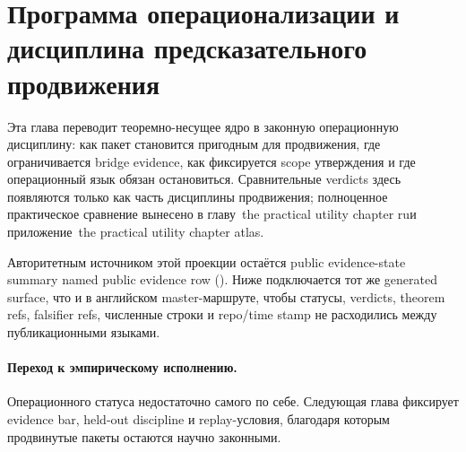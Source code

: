 \section{Программа операционализации и дисциплина предсказательного продвижения}
\label{sec:oc-core-1-3-operationalization-program-ru}

Эта глава переводит теоремно-несущее ядро в законную операционную дисциплину:
как пакет становится пригодным для продвижения, где ограничивается bridge
evidence, как фиксируется scope утверждения и где операционный язык обязан
остановиться. Сравнительные verdicts здесь появляются только как часть
дисциплины продвижения; полноценное практическое сравнение вынесено в
главу~the practical utility chapter ruи
приложение~the practical utility chapter atlas.

Авторитетным источником этой проекции остаётся public evidence-state summary
named public evidence row
(). Ниже подключается тот же generated
surface, что и в английском master-маршруте, чтобы статусы, verdicts, theorem
refs, falsifier refs, численные строки и repo/time stamp не расходились между
публикационными языками.

\begingroup
\small

\endgroup

\paragraph{Переход к эмпирическому исполнению.}
Операционного статуса недостаточно самого по себе. Следующая глава фиксирует
evidence bar, held-out discipline и replay-условия, благодаря которым
продвинутые пакеты остаются научно законными.
